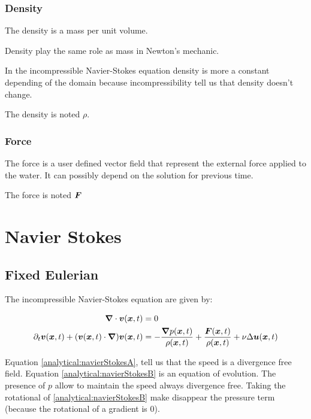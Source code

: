 \subsubsection{Density}

The density is a mass per unit volume.

Density play the same role as mass in Newton's mechanic.

In the incompressible Navier-Stokes equation density is more a constant depending
of the domain because incompressibility tell us that density doesn't change.

The density is noted $\rho$.

\subsubsection{Force}

The force is a user defined vector field that represent the external force applied to the water.
It can possibly depend on the solution for previous time.

The force is noted ${\boldsymbol {F}}$

\section{Navier Stokes}

\subsection{Fixed Eulerian}
\label{analytical:fixe_eulerian}
The incompressible Navier-Stokes equation are given by:

\begin{align}
\label{analytical:navierStokesA}
{\boldsymbol {\nabla}} \cdot {\boldsymbol {v}}({\boldsymbol {x}} ,t)&=0\\
\label{analytical:navierStokesB}
\partial_t {\boldsymbol {v}}({\boldsymbol {x}} ,t)+({\boldsymbol {v}}({\boldsymbol {x}},t)\cdot{\boldsymbol {\nabla}} ) {\boldsymbol {v}}({\boldsymbol {x}} ,t)&=-\frac{{\boldsymbol {\nabla}} p({\boldsymbol {x}},t)}{\rho({\boldsymbol {x}},t)}+\frac{{\boldsymbol {F}}({\boldsymbol {x}},t)}{\rho({\boldsymbol {x}},t)}+\nu \Delta {\boldsymbol {u}}({\boldsymbol {x}},t)
\end{align}

Equation \ref{analytical:navierStokesA}, tell us that the speed is a divergence free field.
Equation \ref{analytical:navierStokesB} is an equation of evolution. The presence of $p$ allow to maintain the speed always divergence free.
Taking the rotational of \ref{analytical:navierStokesB} make disappear the pressure term (because the rotational of a gradient is 0).

